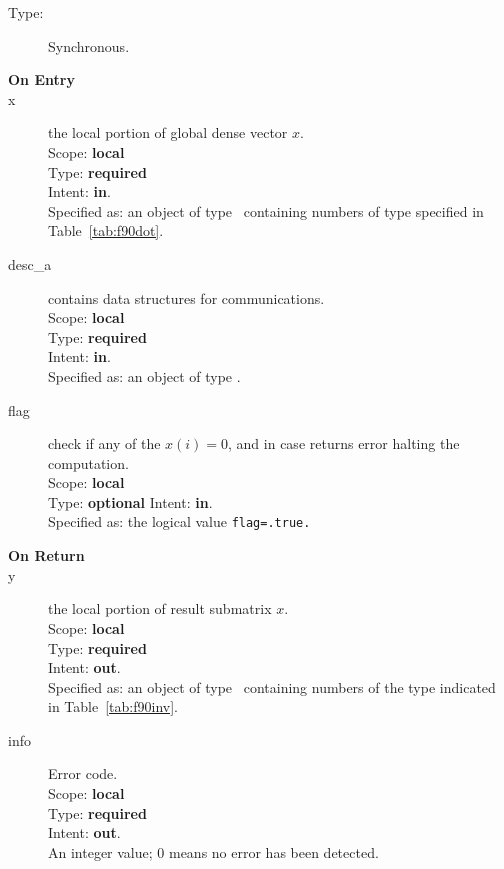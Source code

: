 \begin{description}
	\item[Type:] Synchronous.
	\item[\bf On Entry]
	\item[x] the local portion of global dense vector
	$x$.\\
	Scope: {\bf local} \\
	Type: {\bf required} \\
	Intent: {\bf in}.\\
	Specified as:  an object of type \vdata\ 
	containing numbers of type specified in
	Table~\ref{tab:f90dot}.
	\item[desc\_a] contains data structures for communications.\\
	Scope: {\bf local} \\
	Type: {\bf required}\\
	Intent: {\bf in}.\\
	Specified as: an object of type \descdata.
	\item[flag] check if any of the $x(i) = 0$, and in case returns error halting the computation.\\
	Scope: {\bf local} \\
	Type: {\bf optional}
	Intent: {\bf in}.\\
	Specified as: the logical value \verb|flag=.true.|
	\item[\bf On Return] 
	\item[y] the local portion of result submatrix $x$.\\
	Scope: {\bf local} \\
	Type: {\bf required} \\
	Intent: {\bf out}.\\
	Specified as: an object of type \vdata\ containing numbers of the type
	indicated in Table~\ref{tab:f90inv}.
	\item[info] Error code.\\
	Scope: {\bf local} \\
	Type: {\bf required} \\
	Intent: {\bf out}.\\
	An integer value; 0 means no error has been detected. 
\end{description}

